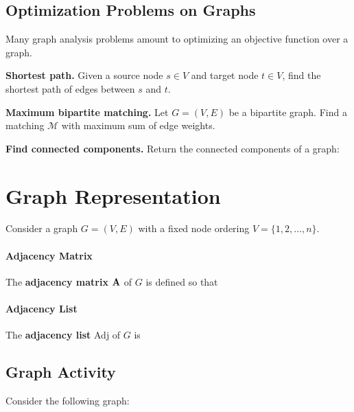 \documentclass[11  pt]{exam}
\begin{document}
	\subsection{Optimization Problems on Graphs}
	Many graph analysis problems amount to optimizing an objective function over a graph.
	
	\begin{example}\textbf{Shortest path.}
		Given a source node $s \in V$ and target node $t \in V$, find the shortest path of edges between $s$ and $t$. 
	\end{example}
	
	\vspace{5cm}
	
	\begin{example}\textbf{Maximum bipartite matching.}
		Let $G = (V,E)$ be a bipartite graph. Find a matching $\mathcal{M}$ with maximum sum of edge weights.
	\end{example}
	
	
	
	\vspace{5cm}
	
	\begin{example}\textbf{Find connected components.}
		Return the connected components of a graph:
		
	\end{example}
	
	\newpage
	
	\section{Graph Representation}
	Consider a graph $G = (V,E)$ with a fixed node ordering $V = \{1, 2, \hdots , n\}$.
	
	\paragraph{Adjacency Matrix}
	The \textbf{adjacency matrix} $\textbf{A}$ of $G$ is defined so that
	
	\vspace{7cm}
	
	\paragraph{Adjacency List}
	The \textbf{adjacency list} Adj of $G$ is 
	
	\newpage 
	
	\subsection*{Graph Activity}
	Consider the following graph:
	
\end{document}
